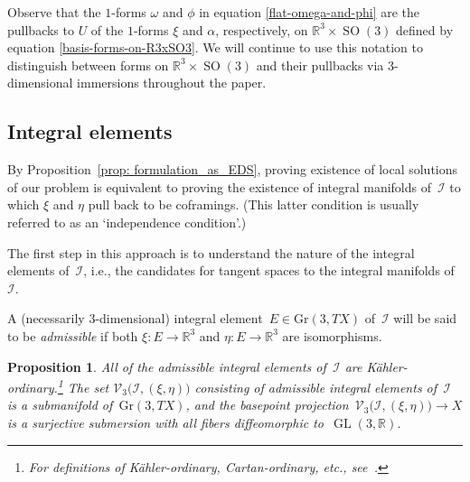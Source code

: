 \documentclass[pdftex]{sigma}
\numberwithin{equation}{section}
\newtheorem{Proposition}[Theorem]{Proposition}
 { \theoremstyle{definition}
\newtheorem{Example}[Theorem]{Example}
\newtheorem{Remark}[Theorem]{Remark} }
\newcommand{\cI}{{\mathcal I}}
\newcommand{\cV}{{\mathcal V}}
\newcommand{\bbR}{{\mathbb R}}
\newcommand{\GL}{\operatorname{GL}}
\newcommand{\SO}{\operatorname{SO}}
\begin{document}
\begin{Remark}Observe that the $1$-forms $\omega$ and $\phi$ in equation \eqref{flat-omega-and-phi} are the pullbacks to $U$ of the $1$-forms $\xi$ and $\alpha$, respectively, on $\bbR^3 \times \SO(3)$ defined by equation \eqref{basis-forms-on-R3xSO3}. We will continue to use this notation to distinguish between forms on $\bbR^3 \times \SO(3)$ and their pullbacks via 3-dimensional immersions throughout the paper.
\end{Remark}



\subsection{Integral elements}
By Proposition~\ref{prop: formulation_as_EDS},
proving existence of local solutions of our problem
is equivalent to proving the existence of integral manifolds of~$\cI$
to which $\xi$ and $\eta$ pull back to be coframings. (This latter
condition is usually referred to as an `independence condition'.)

The first step in this approach
is to understand the nature of the integral elements of~$\cI$,
i.e., the candidates for tangent spaces to the integral manifolds of~$\cI$.

A (necessarily $3$-dimensional) integral element~$E\in\mathrm{Gr}(3,TX)$
of~$\cI$ will be said to be \emph{admissible}
if both $\xi\colon E\to\bbR^3$ and $\eta\colon E\to\bbR^3$ are isomorphisms.

\begin{Proposition}\label{prop: K-ordinaryintegralelements}
All of the admissible integral elements of~$\cI$ are K\"ahler-ordinary.\footnote{For definitions of K\"ahler-ordinary, Cartan-ordinary, etc.,
see~\cite[Chapter~III, Definition~1.7]{BCGGG}.}
The set $\cV_3\bigl(\cI,(\xi,\eta)\bigr)$
consisting of admissible integral elements of~$\cI$
is a submanifold of~$\mathrm{Gr}(3,TX)$,
and the basepoint projection~$\cV_3\bigl(\cI,(\xi,\eta)\bigr)\to X$
is a surjective submersion
with all fibers diffeomorphic to~$\GL(3,\bbR)$.
\end{Proposition}
\end{document}
